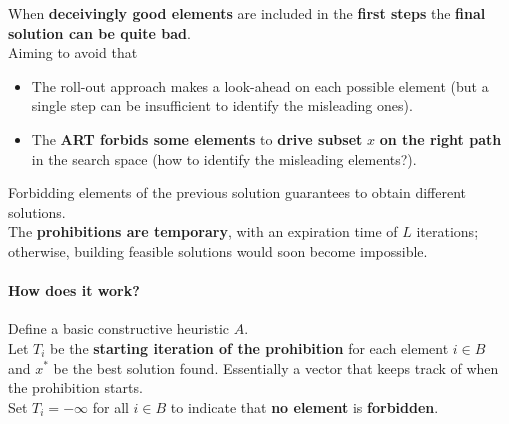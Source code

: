 When \textbf{deceivingly good elements} are included in the \textbf{first steps} the \textbf{final solution can be quite bad}.\\

Aiming to avoid that
\begin{itemize}
	\item The roll-out approach makes a look-ahead on each possible element (but a single step can be insufficient to identify the misleading ones).\\
	
	\item The \textbf{ART forbids some elements} to \textbf{drive subset} $x$ \textbf{on the right path} in the search space (how to identify the misleading elements?).\\
\end{itemize}

Forbidding elements of the previous solution guarantees to obtain different solutions.\\

The \textbf{prohibitions are temporary}, with an expiration time of $L$ iterations; otherwise, building feasible solutions would soon become impossible.\\

\newpage

\paragraph{How does it work?} Define a basic constructive heuristic $A$.\\

Let $T_i$ be the \textbf{starting iteration of the prohibition} for each element $i \in B$ and $x^\ast$ be the best solution found. Essentially a vector that keeps track of when the prohibition starts.\\

Set $T_i = −\infty$ for all $i \in B$ to indicate that \textbf{no element} is \textbf{forbidden}.\\

